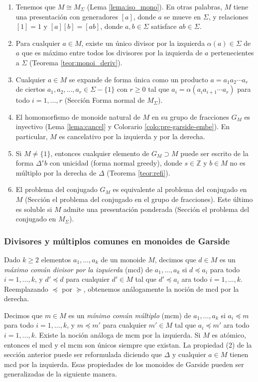 \documentclass[12pt]{article}
\theoremstyle{definition}
\begin{document}
\begin{enumerate}[label=(\arabic*)]
\item Tenemos que $M\cong M_\Sigma$ (Lema \ref{lema:iso_mono}). En otras palabras, $M$ tiene una presentación con generadores $[a]$, donde $a$ se mueve en $\Sigma$, y relaciones $[1]=1$ y $[a][b]=[ab]$, donde $a,b\in\Sigma$ satisface $ab\in\Sigma$.
\item Para cualquier $a\in M$, existe un único divisor por la izquierda $\alpha(a)\in\Sigma$ de $a$ que es máximo entre todos los divisores por la izquierda de $a$ pertenecientes a $\Sigma$ (Teorema \ref{teor:monoi_deriv}).
\item Cualquier $a\in M$ se expande de forma única como un producto $a=a_1a_2\cdots a_r$ de ciertos $a_1,a_2,\ldots,a_r\in\Sigma - \{1\}$ con $r\geq 0$ tal que $a_i=\alpha(a_ia_{i+1}\cdots a_r)$ para todo $i=1,\ldots,r$ (Sección Forma normal de $M_\Sigma$).
\item El homomorfismo de monoide natural de $M$ en su grupo de fracciones $G_M$ es inyectivo (Lema \ref{lema:cancel} y Colorario \ref{colo:pre-garside-embe}). En particular, $M$ es cancelativo por la izquierda y por la derecha.
\item Si $M\neq \{1\}$, entonces cualquier elemento de $G_M\supset M$ puede ser escrito de la forma $\Delta^s b$ con unicidad (forma normal greedy), donde $s\in\mathbb{Z}$ y $b\in M$ no es múltiplo por la derecha de $\Delta$ (Teorema \ref{teor:refi}).
\item El problema del conjugado $G_M$ es equivalente al problema del conjugado en $M$ (Sección el problema del conjugado en el grupo de fracciones). Este último es soluble si $M$ admite una presentación ponderada (Sección el problema del conjugado en $M_\Sigma$).
\end{enumerate}

\subsubsection{Divisores y múltiplos comunes en monoides de Garside}

Dado $k\geq 2$ elementos $a_1,\ldots,a_k$ de un monoide $M$, decimos que $d\in M$ es un \textit{máximo común divisor por la izquierda} (mcd) de $a_1,\ldots,a_k$ si $d\preceq a_i$ para todo $i=1,\ldots,k$, y $d'\preceq d$ para cualquier $d'\in M$ tal que $d'\preceq a_i$ ara todo $i=1,\ldots,k$. Reemplazando $\preceq$ por $\succeq$, obtenemos análogamente la noción de mcd por la derecha.

Decimos que $m\in M$ es un \textit{mínimo común múltiplo} (mcm) de $a_1,\ldots,a_k$ si $a_i\preceq m$ para todo $i=1,\ldots,k$, y $m\preceq m'$ para cualquier $m'\in M$ tal que $a_i\preceq m'$ ara todo $i=1,\ldots,k$. Existe la noción análoga de mcm por la izquierda. Si $M$ es atómico, entonces el mcd y el mcm son únicos siempre que existan. La propiedad (2) de la sección anterior puede ser reformulada diciendo que $\Delta$ y cualquier $a\in M$ tienen mcd por la izquierda. Esas propiedades de los monoides de Garside pueden ser generalizadas de la siguiente manera.
\end{document}

